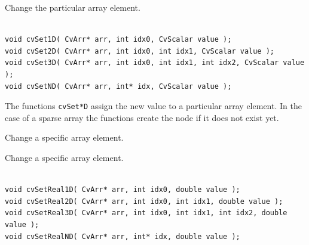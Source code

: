 \else
{}\label{Set*D}

Change the particular array element.

\begin{lstlisting}

void cvSet1D( CvArr* arr, int idx0, CvScalar value );
void cvSet2D( CvArr* arr, int idx0, int idx1, CvScalar value );
void cvSet3D( CvArr* arr, int idx0, int idx1, int idx2, CvScalar value );
void cvSetND( CvArr* arr, int* idx, CvScalar value );

\end{lstlisting}
\fi

\begin{description}
\end{description}

The functions \texttt{cvSet*D} assign the new value to a particular array element. In the case of a sparse array the functions create the node if it does not exist yet.

\ifplastex
{} 
 
 
 Change a specific array element.

\else
{}\label{SetReal*D}

Change a specific array element.

\begin{lstlisting}

void cvSetReal1D( CvArr* arr, int idx0, double value );
void cvSetReal2D( CvArr* arr, int idx0, int idx1, double value );
void cvSetReal3D( CvArr* arr, int idx0, int idx1, int idx2, double value );
void cvSetRealND( CvArr* arr, int* idx, double value );

\end{lstlisting}
\fi

\begin{description}
\end{description}

